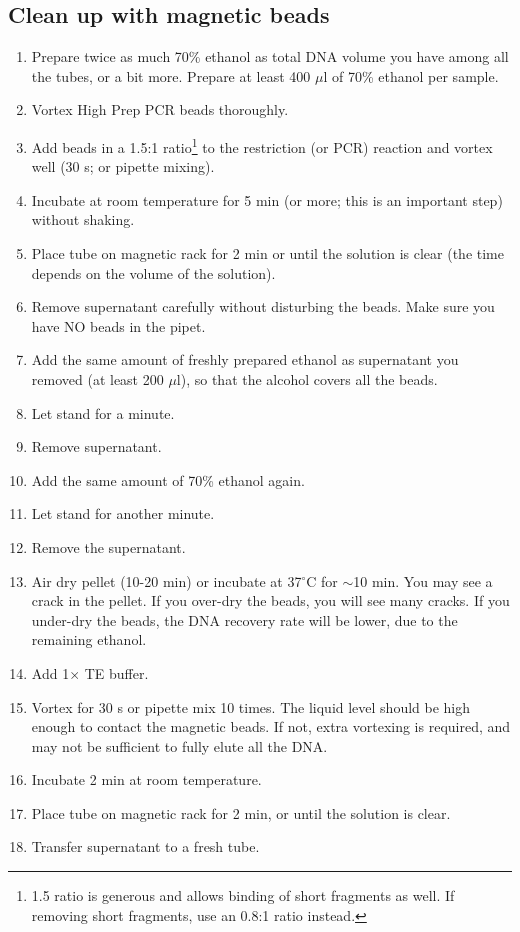 \documentclass[a4paper,12pt]{article}
\begin{document}
\subsection{Clean up with magnetic beads}
\begin{enumerate}
\item Prepare twice as much 70\% ethanol as total DNA volume you have among all the tubes, or a bit more. Prepare at least 400 $\mu$l of 70\% ethanol per sample.
\item Vortex High Prep PCR beads thoroughly.
\item Add beads in a 1.5:1 ratio\footnote{1.5 ratio is generous and allows binding of short fragments as well. If removing short fragments, use an 0.8:1 ratio instead.} to the restriction (or PCR) reaction and vortex well (30 s; or pipette mixing).
\item Incubate at room temperature for 5 min (or more; this is an important step) without shaking.
\item Place tube on magnetic rack for 2 min or until the solution is clear (the time depends on the volume of the solution).
\item Remove supernatant carefully without disturbing the beads. Make sure you have NO beads in the pipet.
\item Add the same amount of freshly prepared ethanol as supernatant you removed (at least 200 $\mu$l), so that the alcohol covers all the beads.
\item Let stand for a minute.
\item Remove supernatant.
\item Add the same amount of 70\% ethanol again.
\item Let stand for another minute.
\item Remove the supernatant.
\item Air dry pellet (10-20 min) or incubate at 37$^{\circ}$C for $\sim$10 min. You may see a crack in the pellet. If you over-dry the beads, you will see many cracks. If you under-dry the beads, the DNA recovery rate will be lower, due to the remaining ethanol. 
\item Add 1$\times$ TE buffer.
\item Vortex for 30 s or pipette mix 10 times. The liquid level should be high enough to contact the magnetic beads. If not, extra vortexing is required, and may not be sufficient to fully elute all the DNA.
\item Incubate 2 min at room temperature.
\item Place tube on magnetic rack for 2 min, or until the solution is clear.
\item Transfer supernatant to a fresh tube.
\end{enumerate}
\end{document}
